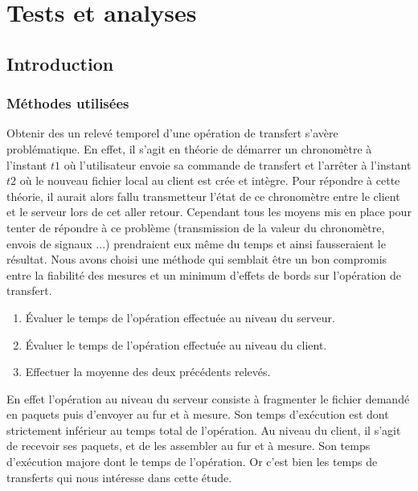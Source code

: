 
\chapter{Tests et analyses}
\section{Introduction}
\subsection{Méthodes utilisées}
Obtenir des un relevé temporel d'une opération de transfert s'avère problématique. En effet, il s'agit en théorie de démarrer un chronomètre  à l'instant $t1$ où l'utilisateur envoie sa commande de transfert et l'arrêter à l'instant $t2$ où le nouveau fichier local au client est crée et intègre. Pour répondre à cette théorie, il aurait alors fallu transmetteur l'état de ce chronomètre entre le client et le serveur lors de cet aller retour. Cependant tous les moyens mis en place pour tenter de répondre à ce problème (transmission de la valeur du chronomètre, envois de signaux ...) prendraient eux même du temps et ainsi fausseraient le résultat. Nous avons choisi une méthode qui semblait être un bon compromis entre la fiabilité des mesures et un minimum d'effets de bords sur l'opération de transfert.

\begin{enumerate}
\item Évaluer le temps de l'opération effectuée au niveau du serveur. 
\item Évaluer le temps de l'opération effectuée au niveau du client.
\item Effectuer la moyenne des deux précédents relevés.
\end{enumerate}
En effet l'opération au niveau du serveur consiste à fragmenter le fichier demandé en paquets puis d'envoyer au fur et à mesure. Son temps d'exécution est dont strictement inférieur au temps total de l'opération. 
Au niveau du client, il s'agit de recevoir ses paquets, et de les assembler au fur et à mesure. Son temps d'exécution majore dont le temps de l'opération. Or c'est bien les temps de transferts qui nous intéresse dans cette étude.
 

